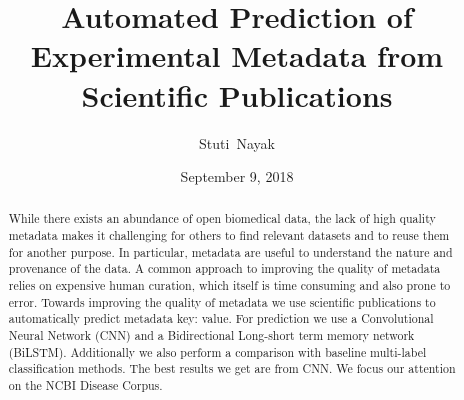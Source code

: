 \documentclass[10pt]{reportMaster}
\title{Automated Prediction of Experimental Metadata from Scientific Publications}
\author{Stuti\ Nayak}
\date{September 9, 2018}
\begin{document}
\maketitle
\begin{abstract}
    While there exists an abundance of open biomedical data, the lack of high quality metadata makes it challenging for others to find relevant datasets and to reuse them for another purpose. In particular, metadata are useful to understand the nature and provenance of the data. A common approach to improving the quality of metadata relies on expensive human curation, which itself is time consuming and also prone to error. Towards improving the quality of metadata we use scientific publications to automatically predict metadata key: value. For prediction we use a Convolutional Neural Network (CNN) and  a Bidirectional Long-short term memory network (BiLSTM). Additionally we also perform a comparison with baseline multi-label classification methods. The best results we get are from CNN. We focus our attention on the NCBI Disease Corpus. 
\end{abstract}

\renewcommand{\abstractname}{Acknowledgements}
\begin{abstract}

 
 
\end{abstract}

\tableofcontents

\listoffigures
 
\listoftables








%

%




\end{document}
